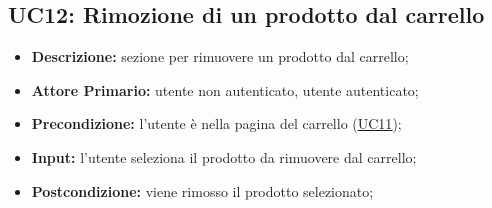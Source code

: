 
\subsection{UC12: Rimozione di un prodotto dal carrello}
\label{sec:UC12}
\begin{itemize}
    \item \textbf{Descrizione:} sezione per rimuovere un prodotto dal carrello;
    \item \textbf{Attore Primario:} utente non autenticato, utente autenticato;
    \item \textbf{Precondizione:} l'utente è nella pagina del carrello (\hyperref[sec:UC11]{\underline{UC11}});
    \item \textbf{Input:} l'utente seleziona il prodotto da rimuovere dal carrello;
    \item \textbf{Postcondizione:} viene rimosso il prodotto selezionato;
\end{itemize}